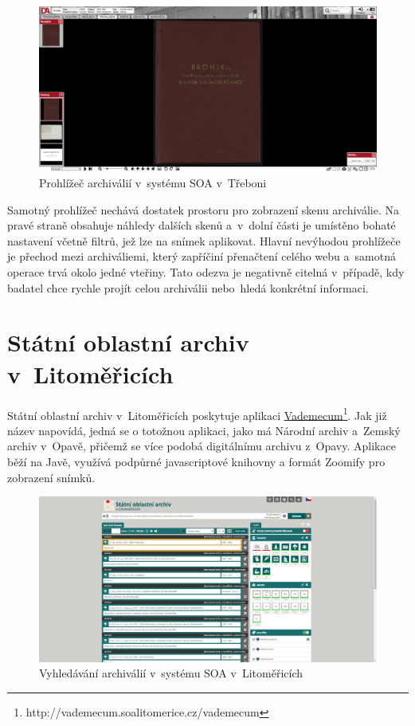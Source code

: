 \begin{figure}[htbp]
\centering
    \includegraphics[scale=.2]{obrazky-figures/archives/soaTrebon/prohlizec.png}
    \caption{Prohlížeč archiválií v~systému SOA v~Třeboni}
\end{figure}

\noindent
Samotný prohlížeč nechává dostatek prostoru pro zobrazení skenu archiválie. Na pravé straně obsahuje náhledy dalších skenů a~v~dolní části je umístěno bohaté nastavení včetně filtrů, jež lze na snímek aplikovat. Hlavní nevýhodou prohlížeče je přechod mezi archiváliemi, který zapříčiní přenačtení celého webu a~samotná operace trvá okolo jedné vteřiny. Tato odezva je negativně citelná v~případě, kdy badatel chce rychle projít celou archiválii nebo~hledá konkrétní informaci.

\section{Státní oblastní archiv v~Litoměřicích}
Státní oblastní archiv v~Litoměřicích poskytuje aplikaci \href{http://vademecum.soalitomerice.cz/vademecum}{Vademecum}\footnote{http://vademecum.soalitomerice.cz/vademecum}. Jak již název napovídá, jedná se o totožnou aplikaci, jako má Národní archiv a~Zemský archiv v~Opavě, přičemž se více podobá digitálnímu archivu z~Opavy. Aplikace běží na Javě, využívá podpůrné javascriptové knihovny a  formát Zoomify pro zobrazení snímků.
\begin{figure}[htbp]
\centering
    \includegraphics[scale=.2]{obrazky-figures/archives/soaLitomerice/vyhledani.png}
    \caption{Vyhledávání archiválií v~systému SOA v~Litoměřicích}
\end{figure}

